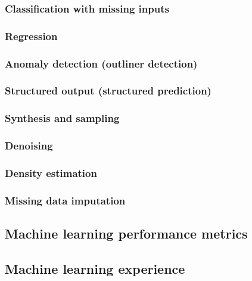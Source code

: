 \subsubsection{Classification with missing inputs}

\subsubsection{Regression}

\subsubsection{Anomaly detection (outliner detection)}

\subsubsection{Structured output (structured prediction)}

\subsubsection{Synthesis and sampling}

\subsubsection{Denoising}

\subsubsection{Density estimation}

\subsubsection{Missing data imputation}


\subsection{Machine learning performance metrics}


\subsection{Machine learning experience}

